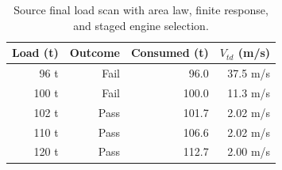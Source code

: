\begin{table}[htbp]
\caption{Source final load scan with area law, finite response, and staged engine selection.}
\label{tab:src19}
\small
\setlength{\tabcolsep}{3.5pt}
\begin{tabularx}{\linewidth}{@{}rrrr@{}}
\toprule
Load (t) & Outcome & Consumed (t) & $V_{td}$ (m/s) \\
\midrule
96 t & Fail & 96.0 & 37.5 m/s \\
100 t & Fail & 100.0 & 11.3 m/s \\
102 t & Pass & 101.7 & 2.02 m/s \\
110 t & Pass & 106.6 & 2.02 m/s \\
120 t & Pass & 112.7 & 2.00 m/s \\
\bottomrule
\end{tabularx}
\end{table}
